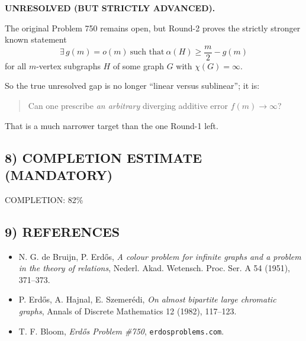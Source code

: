 \noindent
\textbf{UNRESOLVED (BUT STRICTLY ADVANCED).}

The original Problem 750 remains open, but Round-2 proves the strictly stronger known statement
\[
\exists\,g(m)=o(m)\ \text{such that}\ \alpha(H)\ge \frac m2-g(m)
\]
for all $m$-vertex subgraphs $H$ of some graph $G$ with $\chi(G)=\infty$.

So the true unresolved gap is no longer ``linear versus sublinear''; it is:

\begin{quote}
Can one prescribe \emph{an arbitrary} diverging additive error $f(m)\to\infty$?
\end{quote}

That is a much narrower target than the one Round-1 left.

\subsection*{8) COMPLETION ESTIMATE (MANDATORY)}

COMPLETION: 82\%

\subsection*{9) REFERENCES}

\begin{itemize}
\item N. G. de Bruijn, P. Erd\H{o}s, \emph{A colour problem for infinite graphs and a problem in the theory of relations}, Nederl. Akad. Wetensch. Proc. Ser. A 54 (1951), 371--373.
\item P. Erd\H{o}s, A. Hajnal, E. Szemer\'edi, \emph{On almost bipartite large chromatic graphs}, Annals of Discrete Mathematics 12 (1982), 117--123.
\item T. F. Bloom, \emph{Erd\H{o}s Problem \#750}, \texttt{erdosproblems.com}.
\end{itemize}
